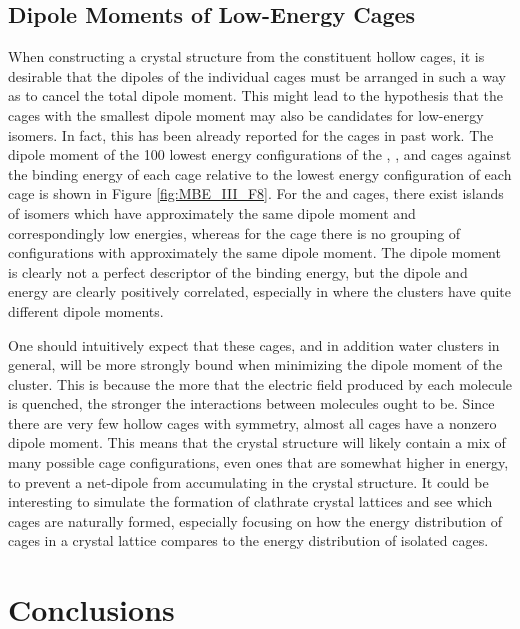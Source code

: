 \documentclass[11pt, proquest]{uwthesis}[2020/02/24]
\let\ce\ch
\begin{document}
\subsection{Dipole Moments of Low-Energy Cages}



\par When constructing a crystal structure from the constituent hollow cages, it is desirable that the dipoles of the individual cages must be arranged in such a way as to cancel the total dipole moment. This might lead to the hypothesis that the cages with the smallest dipole moment may also be candidates for low-energy isomers. In fact, this has been already reported for the \ce{(H2O)_{20}} cages in past work.\autocite{kirov_identifying_2008} The dipole moment of the 100 lowest energy configurations of the \ce{(H2O)_{20}}, \ce{(H2O)_{24}}, and \ce{(H2O)_{28}} cages against the binding energy of each cage relative to the lowest energy configuration of each cage is shown in Figure \ref{fig:MBE_III_F8}. For the \ce{(H2O)_{20}} and \ce{(H2O)_{24}} cages, there exist islands of isomers which have approximately the same dipole moment and correspondingly low energies, whereas for the \ce{(H2O)_{28}} cage there is no grouping of configurations with approximately the same dipole moment. The dipole moment is clearly not a perfect descriptor of the binding energy, but the dipole and energy are clearly positively correlated, especially in \ce{(H2O)_{28}} where the clusters have quite different dipole moments.

\par One should intuitively expect that these cages, and in addition water clusters in general, will be more strongly bound when minimizing the dipole moment of the cluster. This is because the more that the electric field produced by each molecule is quenched, the stronger the interactions between molecules ought to be. Since there are very few hollow cages with symmetry, almost all cages have a nonzero dipole moment. This means that the crystal structure will likely contain a mix of many possible cage configurations, even ones that are somewhat higher in energy, to prevent a net-dipole from accumulating in the crystal structure. It could be interesting to simulate the formation of clathrate crystal lattices and see which cages are naturally formed, especially focusing on how the energy distribution of cages in a crystal lattice compares to the energy distribution of isolated cages.

\section{Conclusions}
\end{document}
